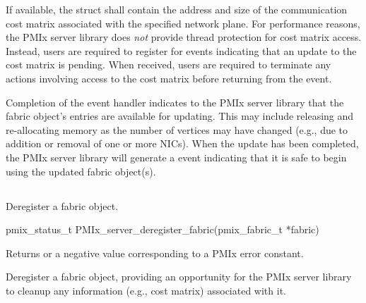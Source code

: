 If available, the  struct shall contain the address and size of the communication cost matrix associated with the specified network plane. For performance reasons, the \ac{PMIx} server library does \emph{not} provide thread protection for cost matrix access. Instead, users are required to register for  events indicating that an update to the cost matrix is pending. When received, users are required to terminate any actions involving access to the cost matrix before returning from the event.

Completion of the  event handler indicates to the \ac{PMIx} server library that the fabric object's entries are available for updating. This may include releasing and re-allocating memory as the number of vertices may have changed (e.g., due to addition or removal of one or more \acp{NIC}). When the update has been completed, the \ac{PMIx} server library will generate a  event indicating that it is safe to begin using the updated fabric object(s).

\subsection{}

\summary

Deregister a fabric object.

\format

\cspecificstart
\begin{codepar}
pmix_status_t PMIx_server_deregister_fabric(pmix_fabric_t *fabric)
\end{codepar}
\cspecificend

\begin{arglist}
\end{arglist}

Returns  or a negative value corresponding to a \ac{PMIx} error constant.

\descr

Deregister a fabric object, providing an opportunity for the \ac{PMIx} server library to cleanup any information (e.g., cost matrix) associated with it.


\subsection{}

